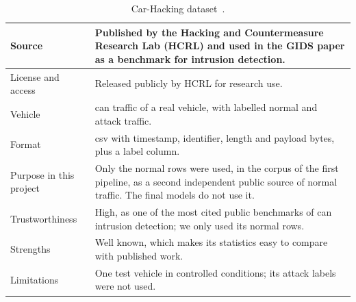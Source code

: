 \begin{table}[H]
\centering
\footnotesize
\caption{Car-Hacking dataset~\cite{seo2018gids}.}
\label{tab:app-carhacking}
\begin{tabularx}{\textwidth}{|P{3cm}|Y|}
\hline
Source & Published by the Hacking and Countermeasure Research Lab (HCRL) and used in the GIDS paper as a benchmark for intrusion detection. \\
\hline
License and access & Released publicly by HCRL for research use. \\
\hline
Vehicle & \gls{can} traffic of a real vehicle, with labelled normal and attack traffic. \\
\hline
Format & \gls{csv} with timestamp, identifier, length and payload bytes, plus a label column. \\
\hline
Purpose in this project & Only the normal rows were used, in the corpus of the first pipeline, as a second independent public source of normal traffic. The final models do not use it. \\
\hline
Trustworthiness & High, as one of the most cited public benchmarks of \gls{can} intrusion detection; we only used its normal rows. \\
\hline
Strengths & Well known, which makes its statistics easy to compare with published work. \\
\hline
Limitations & One test vehicle in controlled conditions; its attack labels were not used. \\
\hline
\end{tabularx}
\end{table}

